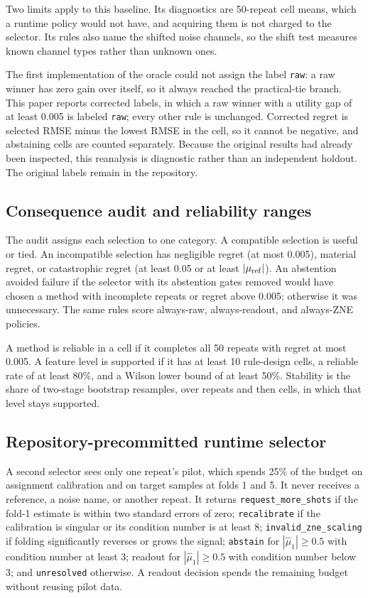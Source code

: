 \documentclass[10pt,twocolumn]{article}
\begin{document}
Two limits apply to this baseline. Its diagnostics are 50-repeat cell means, which a
runtime policy would not have, and acquiring them is not charged to the selector.
Its rules also name the shifted noise channels, so the shift test measures known
channel types rather than unknown ones.

The first implementation of the oracle could not assign the label \texttt{raw}: a raw
winner has zero gain over itself, so it always reached the practical-tie branch. This
paper reports corrected labels, in which a raw winner with a utility gap of at least
0.005 is labeled \texttt{raw}; every other rule is unchanged. Corrected regret is
selected RMSE minus the lowest RMSE in the cell, so it cannot be negative, and
abstaining cells are counted separately. Because the original results had already been
inspected, this reanalysis is diagnostic rather than an independent holdout. The
original labels remain in the repository.

\subsection{Consequence audit and reliability ranges}
The audit assigns each selection to one category. A compatible selection is useful or
tied. An incompatible selection has negligible regret (at most 0.005), material regret,
or catastrophic regret (at least 0.05 or at least $|\mu_{\rm ref}|$). An abstention
avoided failure if the selector with its abstention gates removed would have chosen a
method with incomplete repeats or regret above 0.005; otherwise it was unnecessary.
The same rules score always-raw, always-readout, and always-ZNE policies.

A method is reliable in a cell if it completes all 50 repeats with regret at most
0.005. A feature level is supported if it has at least 10 rule-design cells, a reliable
rate of at least 80\%, and a Wilson lower bound of at least 50\%. Stability is the
share of two-stage bootstrap resamples, over repeats and then cells, in which that level
stays supported.

\subsection{Repository-precommitted runtime selector}
A second selector sees only one repeat's pilot, which spends 25\% of the budget on assignment
calibration and on target samples at folds 1 and 5. It never receives a reference, a noise name,
or another repeat. It returns \texttt{request\_more\_shots} if the fold-1 estimate is within two
standard errors of zero; \texttt{recalibrate} if the calibration is singular or its condition
number is at least 8; \texttt{invalid\_zne\_scaling} if folding significantly reverses or grows
the signal; \texttt{abstain} for $|\widehat\mu_1|\geq0.5$ with condition number at least 3;
readout for $|\widehat\mu_1|\geq0.5$ with condition number below 3; and \texttt{unresolved}
otherwise. A readout decision spends the remaining budget without reusing pilot data.
\end{document}
